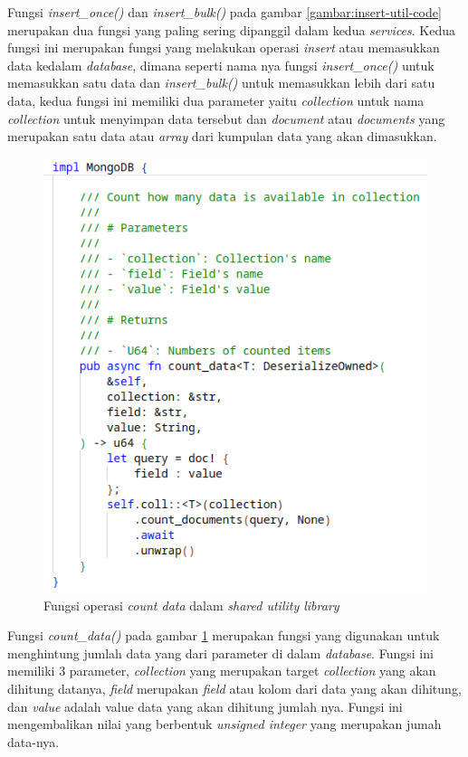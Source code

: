 Fungsi \emph{insert\_once()} dan \emph{insert\_bulk()} pada gambar \ref{gambar:insert-util-code} merupakan dua fungsi yang paling sering dipanggil dalam kedua \emph{services}. Kedua fungsi ini merupakan fungsi yang melakukan operasi \emph{insert} atau memasukkan data kedalam \emph{database}, dimana seperti nama nya fungsi \emph{insert\_once()} untuk memasukkan satu data dan \emph{insert\_bulk()} untuk memasukkan lebih dari satu data, kedua fungsi ini memiliki dua parameter yaitu \emph{collection} untuk nama \emph{collection} untuk menyimpan data tersebut dan \emph{document} atau \emph{documents} yang merupakan satu data atau \emph{array} dari kumpulan data yang akan dimasukkan.

\begin{figure}[H]
  \centering
  \includegraphics[keepaspectratio, width=12cm]{gambar/util-count-data-code.png}
  \caption{Fungsi operasi \emph{count data} dalam \emph{shared utility library}}
  \label{gambar:count-util-code}
\end{figure}

Fungsi \emph{count\_data()} pada gambar \ref{gambar:count-util-code} merupakan fungsi yang digunakan untuk menghintung jumlah data yang dari parameter di dalam \emph{database}. Fungsi ini memiliki 3 parameter, \emph{collection} yang merupakan target \emph{collection} yang akan dihitung datanya, \emph{field} merupakan \emph{field} atau kolom dari data yang akan dihitung, dan \emph{value} adalah value data yang akan dihitung jumlah nya. Fungsi ini mengembalikan nilai yang berbentuk \emph{unsigned integer} yang merupakan jumah data-nya.

